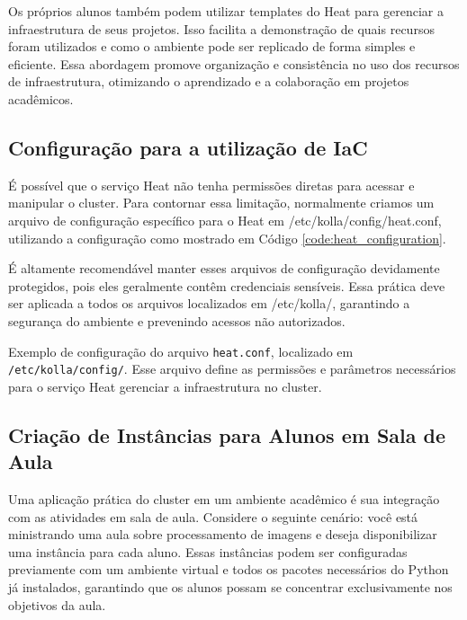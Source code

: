 Os próprios alunos também podem utilizar templates do Heat para gerenciar a infraestrutura de seus projetos. Isso facilita a demonstração de quais recursos foram utilizados e como o ambiente pode ser replicado de forma simples e eficiente. Essa abordagem promove organização e consistência no uso dos recursos de infraestrutura, otimizando o aprendizado e a colaboração em projetos acadêmicos.

\subsection{Configuração para a utilização de IaC}
É possível que o serviço Heat não tenha permissões diretas para acessar e manipular o cluster. Para contornar essa limitação, normalmente criamos um arquivo de configuração específico para o Heat em /etc/kolla/config/heat.conf, utilizando a configuração como mostrado em Código \ref{code:heat_configuration}.

É altamente recomendável manter esses arquivos de configuração devidamente protegidos, pois eles geralmente contêm credenciais sensíveis. Essa prática deve ser aplicada a todos os arquivos localizados em /etc/kolla/, garantindo a segurança do ambiente e prevenindo acessos não autorizados.


\begin{listing}[h!]
    \noindent{}  
  \caption{Exemplo de configuração do arquivo \texttt{heat.conf}, localizado em \texttt{/etc/kolla/config/}. Esse arquivo define as permissões e parâmetros necessários para o serviço Heat gerenciar a infraestrutura no cluster.}
  \label{code:heat_configuration}
\end{listing}


\subsection{Criação de Instâncias para Alunos em Sala de Aula}

Uma aplicação prática do cluster em um ambiente acadêmico é sua integração com as atividades em sala de aula. Considere o seguinte cenário: você está ministrando uma aula sobre processamento de imagens e deseja disponibilizar uma instância para cada aluno. Essas instâncias podem ser configuradas previamente com um ambiente virtual e todos os pacotes necessários do Python já instalados, garantindo que os alunos possam se concentrar exclusivamente nos objetivos da aula.

